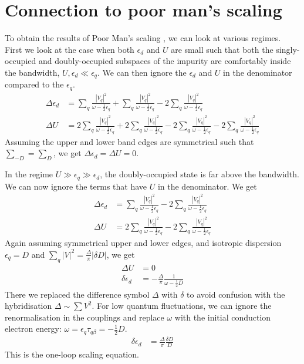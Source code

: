 \section{Connection to poor man's scaling}\label{urg2pms}
To obtain the results of Poor Man's scaling \cite{haldane}\cite{Jefferson},  we can look at various regimes. First we look at the case when both \(\epsilon_d\) and \(U\) are small such that both the singly-occupied and doubly-occupied subspaces of the impurity are comfortably inside the bandwidth, \(U,\epsilon_d \ll \epsilon_q\). We can then ignore the \(\epsilon_d\) and \(U\) in the denominator compared to the \(\epsilon_q\).
\begin{equation}\begin{aligned}
\Delta \epsilon_d &= \sum_{q}\frac{|V_q|^2}{\omega - \frac{1}{2}\epsilon_q} + \sum_{q}\frac{|V_q|^2}{\omega - \frac{1}{2}\epsilon_q} - 2\sum_{q}\frac{|V_q|^2}{\omega - \frac{1}{2}\epsilon_q}\\
\Delta U &= 2\sum_{q}\frac{|V_q|^2}{\omega - \frac{1}{2}\epsilon_q} + 2\sum_{q}\frac{|V_q|^2}{\omega - \frac{1}{2}\epsilon_q} - 2\sum_{q}\frac{|V_q|^2}{\omega - \frac{1}{2}\epsilon_q} - 2\sum_{q}\frac{|V_q|^2}{\omega - \frac{1}{2}\epsilon_q}
\end{aligned}\end{equation}
Assuming the upper and lower band edges are symmetrical such that \(\sum_{-D} = \sum_D\), we get \(\Delta \epsilon_d = \Delta U = 0\). 

In the regime \(U \gg \epsilon_q \gg \epsilon_d\), the doubly-occupied state is far above the bandwidth. We can now ignore the terms that have \(U\) in the denominator. We get
\begin{equation}\begin{aligned}
\Delta \epsilon_d &= \sum_{q}\frac{|V_q|^2}{\omega - \frac{1}{2}\epsilon_q} - 2\sum_{q}\frac{|V_q|^2}{\omega - \frac{1}{2}\epsilon_q}\\
\Delta U &= 2\sum_{q}\frac{|V_q|^2}{\omega - \frac{1}{2}\epsilon_q}  - 2\sum_{q}\frac{|V_q|^2}{\omega - \frac{1}{2}\epsilon_q} 
\end{aligned}\end{equation}
Again assuming symmetrical upper and lower edges, and isotropic dispersion \(\epsilon_q=D\) and \(\sum_q |V|^2 = \frac{\Delta}{\pi}|\delta D|\), we get
\begin{equation}\begin{aligned}
\Delta U &= 0\\
\delta \epsilon_d &= -\frac{\Delta}{\pi}\frac{1}{\omega - \frac{1}{2} D}
\end{aligned}\end{equation}
There we replaced the difference symbol \(\Delta\) with \(\delta\) to avoid confusion with the hybridisation \(\Delta \sim \sum V^2\). For low quantum fluctuations, we can ignore the renormalisation in the couplings and replace \(\omega\) with the initial conduction electron energy: \(\omega = \epsilon_q\tau_{q\beta} = -\frac{1}{2} D\).
\begin{equation}\begin{aligned}
\delta \epsilon_d &= \frac{\Delta}{\pi}\frac{\delta D}{D}
\end{aligned}\end{equation}
This is the one-loop scaling equation.
